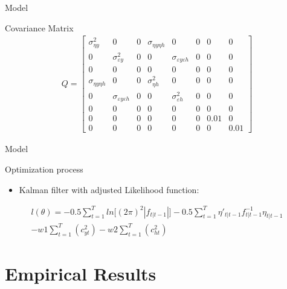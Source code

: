 \documentclass[
  ignorenonframetext,
]{beamer}
\providecommand{\tightlist}{%
  \setlength{\itemsep}{0pt}\setlength{\parskip}{0pt}}
\begin{document}
\begin{frame}{Model}
\protect\hypertarget{model-2}{}
\begin{block}{Covariance Matrix}
\protect\hypertarget{covariance-matrix}{}
\begin{align}
    Q = 
    \begin{bmatrix}
    \sigma^2_{\eta y} & 0  &0 & \sigma_{\eta y \eta h}  & 0 & 0 & 0 & 0 \\
    0 & \sigma^2_{\varepsilon y}  & 0 & 0 & \sigma_{\varepsilon y \varepsilon h}  & 0 & 0 & 0 \\
    0 & 0 & 0 & 0 & 0 & 0 & 0 & 0 \\
    \sigma_{\eta y \eta h}  & 0 & 0 & \sigma^2_{\eta h} & 0 & 0 & 0 & 0 \\
    0 & \sigma_{\varepsilon y \varepsilon h}  & 0 & 0 & \sigma^2_{\varepsilon h} & 0  & 0 & 0 \\
    0 & 0 & 0 & 0 & 0 & 0 & 0 & 0 \\
    0 & 0 & 0 & 0 & 0 & 0 & 0.01 & 0 \\
    0 & 0 & 0 & 0 & 0 & 0 & 0 & 0.01
    \end{bmatrix}
\end{align}
\end{block}
\end{frame}

\begin{frame}{Model}
\protect\hypertarget{model-3}{}
\begin{block}{Optimization process}
\protect\hypertarget{optimization-process}{}
\begin{itemize}
\tightlist
\item
  Kalman filter with adjusted Likelihood function:
\end{itemize}

\begin{align*}
l(\theta) = -0.5\sum_{t=1}^{T}ln\lbrack(2\pi)^2|f_{t|t-1}|\rbrack
                -0.5\sum_{t=1}^{T}\eta'_{t|t-1}f^{-1}_{t|t-1}\eta_{t|t-1}
                \\
                - w1\sum_{t=1}^{T}(c_{yt}^2) - w2\sum_{t=1}^{T}(c_{ht}^2)
\end{align*}
\end{block}
\end{frame}

\hypertarget{empirical-results}{%
\section{Empirical Results}\label{empirical-results}}
\end{document}
